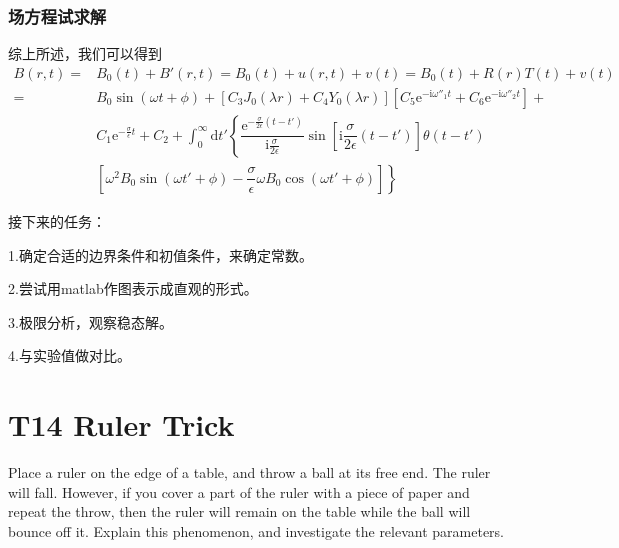 \documentclass[11pt]{beamer}                                                                                               \usetheme{Boadilla}
\begin{document}
	\begin{frame}[fragile]
		\frametitle{场方程试求解}
		综上所述，我们可以得到
		\begin{equation*}
			\begin{split}
				B(r,t)=&B_0(t)+B'(r,t)=B_0(t)+u(r,t)+v(t)=B_0(t)+R(r)T(t)+v(t)\\
				=&B_0 \sin(\omega t+ \phi)+\left[C_3 J_0(\lambda r)+C_4 Y_0(\lambda r)\right]\left[C_5\mathrm{e}^{-\mathrm{i}\omega''_1 t}+C_6\mathrm{e}^{-\mathrm{i}\omega''_2 t}\right]+\\
				&C_1\mathrm{e}^{-\frac{\sigma}{\epsilon}t}+C_2+\displaystyle\int_0^{\infty} \mathrm{d}t' \left\{\dfrac{\mathrm{e}^{-\frac{\sigma}{2 \epsilon}(t-t')}}{\mathrm{i}\frac{\sigma}{2 \epsilon}} \sin\left[\mathrm{i}\dfrac{\sigma}{2 \epsilon}(t-t')\right] \theta(t-t')\right.\\
				&\left.\left[\omega^2 B_0 \sin(\omega t'+\phi)-\dfrac{ \sigma}{\epsilon} \omega B_0 \cos(\omega t'+\phi)\right]\right\}
			\end{split}
		\end{equation*}
		
		接下来的任务：
		
		1.确定合适的边界条件和初值条件，来确定常数。
		
		2.尝试用matlab作图表示成直观的形式。
		
		3.极限分析，观察稳态解。
		
		4.与实验值做对比。
		
	\end{frame}
	
	\section{T14 Ruler Trick}

	\begin{frame}
		\sectionpage
		Place a ruler on the edge of a table, and throw a ball at its free end. The ruler will fall. However, if you cover a part of the ruler with a piece of paper and repeat the throw, then the ruler will remain on the table while the ball will bounce off it. Explain this phenomenon, and investigate the relevant parameters.
	\end{frame}
	
\end{document}
